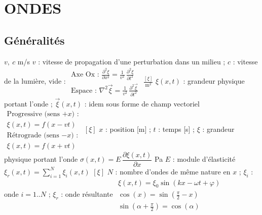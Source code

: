 \section{ONDES}

\subsection{Généralités}
\begin{formules}
    {$v,\ c$}
    {m/s}
    {$v$ : vitesse de propagation d'une perturbation dans un milieu ; $c$ : vitesse de la lumière, vide : \newline
     }
    {$\begin{gathered}
      \text{Axe Ox : } \frac{\partial^2\xi}{\partial x^2} = \frac{1}{v^2}\,\frac{\partial^2\xi}{\partial t^2} \\
      \text{Espace : } \nabla^2\vec\xi = \frac{1}{v^2}\,\frac{\partial^2\vec\xi}{\partial t^2}
     \end{gathered}$}
    {$\frac{[\xi]}{\mathrm{m}^2}$}
    {$\xi(x,t)$ : grandeur physique portant l'onde ; $\vec\xi(x,t)$ : idem sous forme de champ vectoriel}
    {$\begin{gathered}
      \text{Progressive (sens $+x$) :} \\
      \xi(x,t) = f(x - vt) \\
      \text{Rétrograde (sens $-x$) :} \\
      \xi(x,t) = f(x + vt)
     \end{gathered}$}
    {$[\xi]$}
    {$x$ : position [m] ; $t$ : temps [s] ; $\xi$ : grandeur physique portant l'onde}
    {$\sigma(x,t) = E\,\dfrac{\partial\xi(x,t)}{\partial x}$}
    {Pa}
    {$E$ : module d'élasticité}
    {$\xi_r(x,t) = \sum\limits_{i=1}^{N}\xi_i(x,t)$}
    {$[\xi]$}
    {$N$ : nombre d'ondes de même nature en $x$ ; $\xi_i$ : onde $i = 1..N$ ; $\xi_r$ : onde résultante}
    {$\begin{gathered}
      \xi(x,t) = \xi_0\sin(kx - \omega t + \varphi) \\
      \cos(x) = \sin\left(\tfrac{\pi}{2} - x\right) \\
      \sin\left(\alpha + \tfrac{\pi}{2}\right) = \cos(\alpha)
     \end{gathered}$}

\end{formules}
